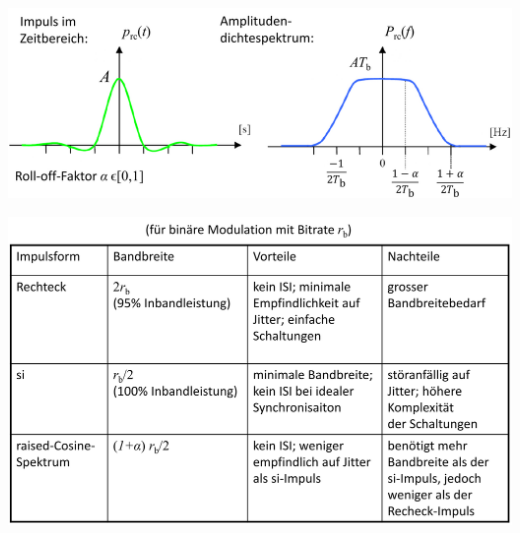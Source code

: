 \begin{center}
	\includegraphics[width=.9\textwidth]{../fig/raisedcos.png}
\end{center}

\begin{center}
	\includegraphics[width=.9\textwidth]{../fig/vergleich.png}
\end{center}

